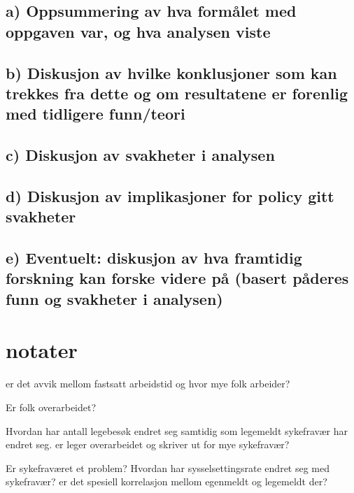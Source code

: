 \documentclass[
  11pt,
  a4paper,
  DIV=11,
  numbers=noendperiod]{scrartcl}
\begin{document}
\subsection{a) Oppsummering av hva formålet med oppgaven var, og hva
analysen
viste}\label{a-oppsummering-av-hva-formuxe5let-med-oppgaven-var-og-hva-analysen-viste}

\subsection{b) Diskusjon av hvilke konklusjoner som kan trekkes fra
dette og om resultatene er forenlig med tidligere
funn/teori}\label{b-diskusjon-av-hvilke-konklusjoner-som-kan-trekkes-fra-dette-og-om-resultatene-er-forenlig-med-tidligere-funnteori}

\subsection{c) Diskusjon av svakheter i
analysen}\label{c-diskusjon-av-svakheter-i-analysen}

\subsection{d) Diskusjon av implikasjoner for policy gitt
svakheter}\label{d-diskusjon-av-implikasjoner-for-policy-gitt-svakheter}

\subsection{e) Eventuelt: diskusjon av hva framtidig forskning kan
forske videre på (basert påderes funn og svakheter i
analysen)}\label{e-eventuelt-diskusjon-av-hva-framtidig-forskning-kan-forske-videre-puxe5-basert-puxe5deres-funn-og-svakheter-i-analysen}

\section{notater}\label{notater}

er det avvik mellom fastsatt arbeidstid og hvor mye folk arbeider?

Er folk overarbeidet?

Hvordan har antall legebesøk endret seg samtidig som legemeldt
sykefravær har endret seg. er leger overarbeidet og skriver ut for mye
sykefravær?

Er sykefraværet et problem? Hvordan har sysselsettingsrate endret seg
med sykefravær? er det spesiell korrelasjon mellom egenmeldt og
legemeldt der?
\end{document}
